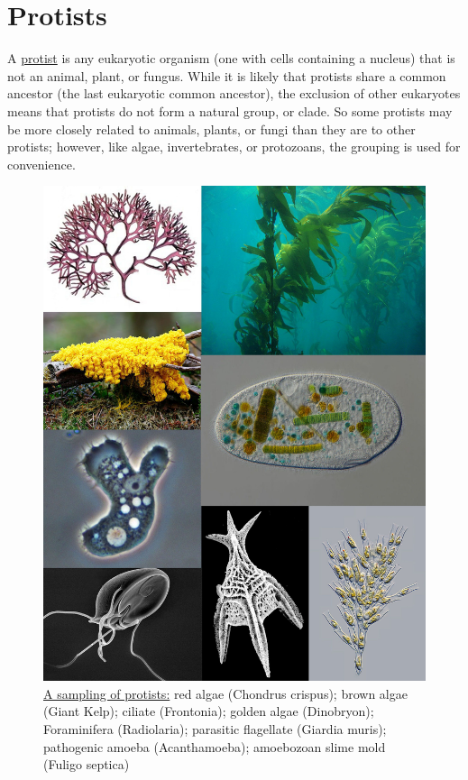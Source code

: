 \hypertarget{protists}{%
\chapter{Protists}\label{protists}}

A \href{https://en.wikipedia.org/wiki/Protist}{protist} is any eukaryotic organism (one with cells containing a nucleus) that is not an animal, plant, or fungus. While it is likely that protists share a common ancestor (the last eukaryotic common ancestor), the exclusion of other eukaryotes means that protists do not form a natural group, or clade. So some protists may be more closely related to animals, plants, or fungi than they are to other protists; however, like algae, invertebrates, or protozoans, the grouping is used for convenience.



\begin{figure}

{\centering \includegraphics[width=0.7\linewidth]{./figures/protista/Protist_collage_2} 

}

\caption{\href{https://commons.wikimedia.org/wiki/File:Protist_collage_2.jpg}{A sampling of protists:} red algae (Chondrus crispus); brown algae (Giant Kelp); ciliate (Frontonia); golden algae (Dinobryon); Foraminifera (Radiolaria); parasitic flagellate (Giardia muris); pathogenic amoeba (Acanthamoeba); amoebozoan slime mold (Fuligo septica)}\label{fig:protistacollage}
\end{figure}

